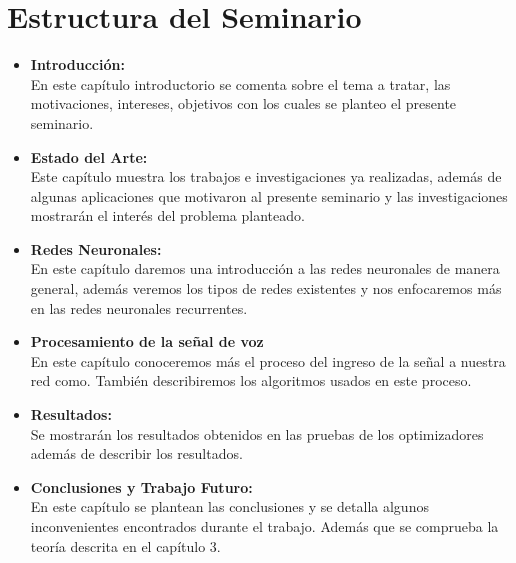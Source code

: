 \section{Estructura del Seminario}


\begin{itemize}

\item \textbf{Introducción:} \\
En este capítulo introductorio se comenta sobre el tema a tratar, las motivaciones, intereses, objetivos con los cuales se planteo el presente seminario.

\item \textbf{Estado del Arte:} \\
Este capítulo muestra los trabajos e investigaciones ya realizadas, además de algunas aplicaciones que motivaron al presente seminario y las investigaciones mostrarán el interés del problema planteado.

\item \textbf{Redes Neuronales:} \\
En este capítulo daremos una introducción a las redes neuronales de manera general, además veremos los tipos de redes existentes y nos enfocaremos más en las redes neuronales recurrentes.
\item \textbf{Procesamiento de la señal de voz} \\
En este capítulo conoceremos más el proceso del ingreso de la señal a nuestra red como. También describiremos los algoritmos usados en este proceso.
\item \textbf{Resultados:} \\
Se mostrarán los resultados obtenidos en las pruebas de los optimizadores además de describir los resultados.
\item \textbf{Conclusiones y Trabajo Futuro:} \\
En este capítulo se plantean las conclusiones y se detalla algunos inconvenientes encontrados durante el trabajo. Además que se comprueba la teoría descrita en el capítulo 3.


\end{itemize}



